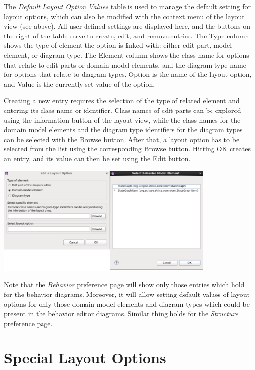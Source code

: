 The \textit{Default Layout Option Values} table is used to manage the default setting for layout options, 
which can also be modified with the context menu of the layout view (see above). All user-defined settings 
are displayed here, and the buttons on the right of the table serve to create, edit, and remove entries. 
The Type column shows the type of element the option is linked with: either edit part, model element, or 
diagram type. The Element column shows the class name for options that relate to edit parts or domain 
model elements, and the diagram type name for options that relate to diagram types. Option is the name of 
the layout option, and Value is the currently set value of the option.

Creating a new entry requires the selection of the type of related element and entering its class name or 
identifier. Class names of edit parts can be explored using the information button of the layout view, 
while the class names for the domain model elements and the diagram type identifiers for the diagram types 
can be selected with the Browse button. After that, a layout option has to be selected from the list using 
the corresponding Browse button. Hitting OK creates an entry, and its value can then be set using the Edit 
button.

\includegraphics[width=0.8\textwidth]{images/043-PreferencePage.png}

Note that the \textit{Behavior} preference page will show only those entries which hold for the behavior 
diagrams. Moreover, it will allow setting default values of layout options for only those domain model 
elements and diagram types which could be present in the behavior editor diagrams. Similar thing holds for 
the \textit{Structure} preference page.

\section{\label{specialOptions}Special Layout Options}

